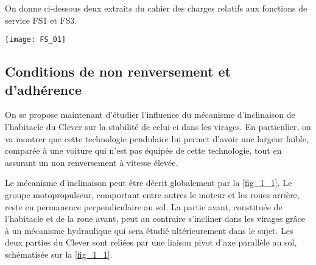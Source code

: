 On donne ci-dessous deux extraits du cahier des charges relatifs aux fonctions de service FS1 et FS3.

\begin{center}
\texttt{[image: FS\_01]}
\end{center}


% 
%
%

\subsection*{Conditions de non renversement et d'adhérence}
On se propose maintenant d'étudier l'influence du mécanisme d'inclinaison de l'habitacle du Clever sur la stabilité de celui-ci dans les virages. En particulier, on va montrer que cette technologie pendulaire lui permet d'avoir une largeur faible, comparée à une voiture qui n'est pas équipée de cette technologie, tout en assurant un non renversement à vitesse élevée.

Le mécanisme d'inclinaison peut être décrit globalement par la \autoref{fig_1_1}. Le groupe motopropulseur, comportant entre autres le moteur et les roues arrière, reste en permanence perpendiculaire au sol. La partie avant, constituée de l'habitacle et de la roue avant, peut au contraire s'incliner dans les virages grâce à un mécanisme hydraulique qui sera étudié ultérieurement dans le sujet. Les deux parties du Clever sont reliées par une liaison pivot d'axe parallèle au sol, schématisée sur la \autoref{fig_1_1}.

